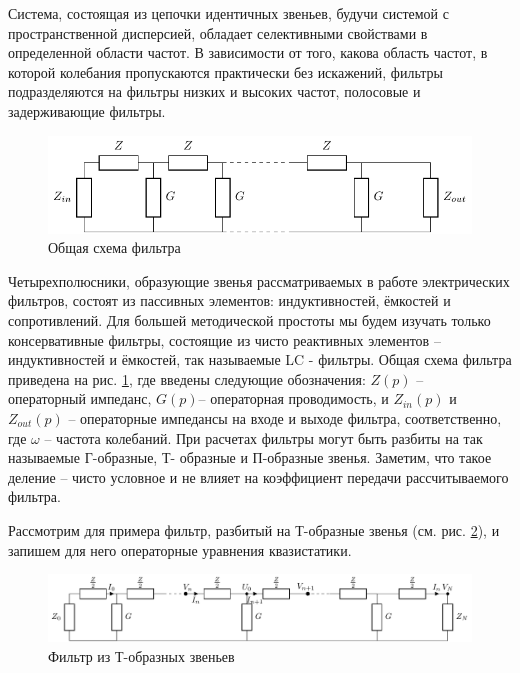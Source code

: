 Система, состоящая из цепочки идентичных звеньев, будучи системой с пространственной дисперсией, обладает селективными свойствами в определенной области частот. В зависимости от того, какова область частот, в которой колебания пропускаются практически без искажений, фильтры подразделяются на фильтры низких и высоких частот, полосовые и задерживающие фильтры.
\begin{figure}[H]
	\centering
	\includegraphics[]{chem/chem1}
	\caption{Общая схема фильтра}
	\label{fig:1}
\end{figure}
Четырехполюсники, образующие звенья рассматриваемых в работе электрических фильтров, состоят из пассивных элементов: индуктивностей, ёмкостей и сопротивлений. Для большей методической простоты мы будем изучать только консервативные фильтры, состоящие из чисто реактивных элементов – индуктивностей и ёмкостей, так называемые LC - фильтры. Общая схема фильтра приведена на рис. \ref{fig:1}, где введены следующие обозначения:  $Z(p)$ – 
$\hyperref[def:1]{\text{операторный импеданс}}$,   $G(p)$– $\hyperref[def:2]{\text{операторная проводимость}}$,   и  $Z_{in}(p)$ и $Z_{out}(p)$ – операторные импедансы на входе и выходе фильтра, соответственно, где $\omega$ – частота колебаний. При расчетах фильтры могут быть разбиты на так называемые Г-образные, Т- образные и П-образные звенья. Заметим, что такое деление -- чисто условное и не влияет на коэффициент передачи рассчитываемого фильтра.

Рассмотрим для примера фильтр, разбитый на Т-образные звенья (см. рис. \ref{fig:2}), и запишем для него операторные уравнения квазистатики.

\begin{figure}[H]
	\centering
	\includegraphics[]{chem/chem2}
	\caption{Фильтр из Т-образных звеньев}
	\label{fig:2}
\end{figure}

